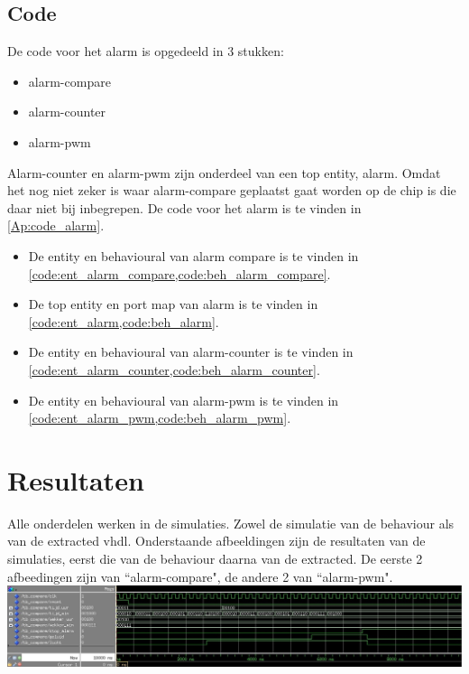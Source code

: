 \subsection{Code}
De code voor het alarm is opgedeeld in 3 stukken:
\begin{itemize}[nolistsep]
\item alarm-compare
\item alarm-counter
\item alarm-pwm
\end{itemize}
Alarm-counter en alarm-pwm zijn onderdeel van een top entity, alarm. Omdat het nog niet zeker is waar alarm-compare geplaatst gaat worden op de chip is die daar niet bij inbegrepen.
De code voor het alarm is te vinden in \cref{Ap:code_alarm}.
\begin{itemize}[nolistsep]
\item De entity en behavioural van alarm compare is te vinden in \cref{code:ent_alarm_compare,code:beh_alarm_compare}.
\item De top entity en port map van alarm is te vinden in \cref{code:ent_alarm,code:beh_alarm}.
\item De entity en behavioural van alarm-counter is te vinden in \cref{code:ent_alarm_counter,code:beh_alarm_counter}.
\item De entity en behavioural van alarm-pwm is te vinden in \cref{code:ent_alarm_pwm,code:beh_alarm_pwm}.
\end{itemize}
\section{Resultaten}
Alle onderdelen werken in de simulaties. Zowel de simulatie van de behaviour als van de extracted vhdl.
Onderstaande afbeeldingen zijn de resultaten van de simulaties, eerst die van de behaviour daarna van de extracted.
De eerste 2 afbeedingen zijn van ``alarm-compare", de andere 2 van ``alarm-pwm".
\\

\includegraphics[width=\textwidth,height=\textheight,keepaspectratio]{results/compare.jpg}

